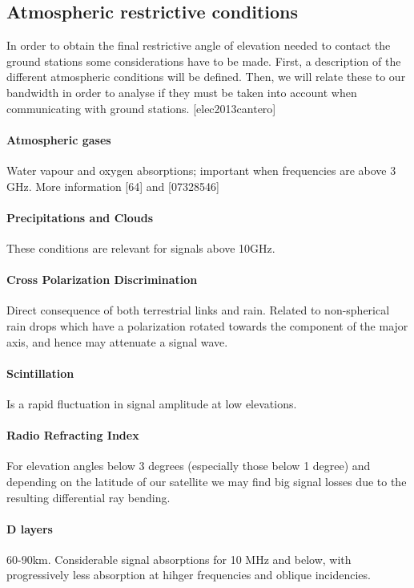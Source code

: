 \subsection{Atmospheric restrictive conditions}
In order to obtain the final restrictive angle of elevation needed to contact the ground stations some considerations have to be made. First, a description of the different atmospheric conditions will be defined. Then, we will relate these to our bandwidth in order to analyse if they must be taken into account when communicating with ground stations. [elec2013cantero]

\paragraph{Atmospheric gases} Water vapour and oxygen absorptions; important when frequencies are above 3 GHz. More information [64] and [07328546]

\paragraph{Precipitations and Clouds} These conditions are relevant for signals above 10GHz.

\paragraph{Cross Polarization Discrimination} Direct consequence of both terrestrial links and rain. Related to non-spherical rain drops which have a polarization rotated towards the component of the major axis, and hence may attenuate a signal wave.

\paragraph{Scintillation} Is a rapid fluctuation in signal amplitude at low elevations.

\paragraph{Radio Refracting Index} For elevation angles below 3 degrees (especially those below 1 degree) and depending on the latitude of our satellite we may find big signal losses due to the resulting differential ray bending.


\paragraph{D layers} 60-90km. Considerable signal absorptions for 10 MHz and below, with progressively less absorption at hihger frequencies and oblique incidencies.

